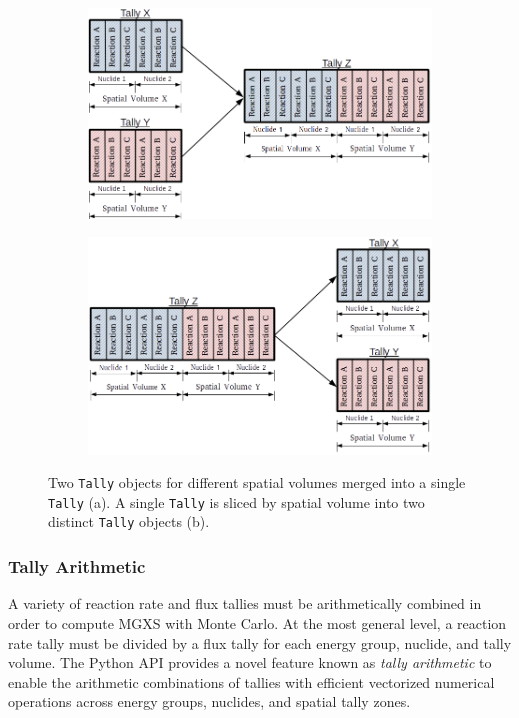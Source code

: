 \begin{figure}
\begin{subfigure}{\textwidth}
  \centering
  \includegraphics[width=0.6\linewidth]{figures/tally-merge}
  \caption{}
\end{subfigure}
\begin{subfigure}{\textwidth}
  \centering
  \includegraphics[width=0.6\linewidth]{figures/tally-slice}
  \caption{}
\end{subfigure}
\caption{Two \texttt{Tally} objects for different spatial volumes merged into a single \texttt{Tally} (a). A single \texttt{Tally} is sliced by spatial volume into two distinct \texttt{Tally} objects (b).}
\label{fig:tally-merge-slice}
\end{figure}

\subsubsection{Tally Arithmetic}
\label{subsubsec:tally-arithmetic}

A variety of reaction rate and flux tallies must be arithmetically combined in order to compute MGXS with Monte Carlo. At the most general level, a reaction rate tally must be divided by a flux tally for each energy group, nuclide, and tally volume. The Python API provides a novel feature known as \emph{tally arithmetic} to enable the arithmetic combinations of tallies with efficient vectorized numerical operations across energy groups, nuclides, and spatial tally zones.

